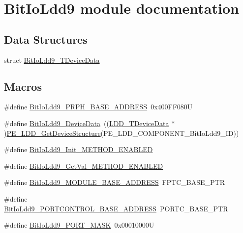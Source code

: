 \hypertarget{group___bit_io_ldd9__module}{\section{Bit\-Io\-Ldd9 module documentation}
\label{group___bit_io_ldd9__module}
}
\subsection*{Data Structures}
\begin{DoxyCompactItemize}
\item 
struct \hyperlink{struct_bit_io_ldd9___t_device_data}{Bit\-Io\-Ldd9\-\_\-\-T\-Device\-Data}
\end{DoxyCompactItemize}
\subsection*{Macros}
\begin{DoxyCompactItemize}
\item 
\#define \hyperlink{group___bit_io_ldd9__module_ga174ae74d2766cb109ec7ede1ae12bc6a}{Bit\-Io\-Ldd9\-\_\-\-P\-R\-P\-H\-\_\-\-B\-A\-S\-E\-\_\-\-A\-D\-D\-R\-E\-S\-S}~0x400\-F\-F080\-U
\item 
\#define \hyperlink{group___bit_io_ldd9__module_ga597e971eb96d12469036edb9403f1391}{Bit\-Io\-Ldd9\-\_\-\-Device\-Data}~((\hyperlink{group___p_e___types__module_gac5cf1362f1f0e3a2ce71b1bf2276d091}{L\-D\-D\-\_\-\-T\-Device\-Data} $\ast$)\hyperlink{group___p_e___types__module_gaa1c23d559daef5bcd3327ca83fb56f5a}{P\-E\-\_\-\-L\-D\-D\-\_\-\-Get\-Device\-Structure}(P\-E\-\_\-\-L\-D\-D\-\_\-\-C\-O\-M\-P\-O\-N\-E\-N\-T\-\_\-\-Bit\-Io\-Ldd9\-\_\-\-I\-D))
\item 
\#define \hyperlink{group___bit_io_ldd9__module_ga91634d0b14500dcabcc1e62debba95d3}{Bit\-Io\-Ldd9\-\_\-\-Init\-\_\-\-M\-E\-T\-H\-O\-D\-\_\-\-E\-N\-A\-B\-L\-E\-D}
\item 
\#define \hyperlink{group___bit_io_ldd9__module_ga41ccac7e5854a7ab7243478e45c51774}{Bit\-Io\-Ldd9\-\_\-\-Get\-Val\-\_\-\-M\-E\-T\-H\-O\-D\-\_\-\-E\-N\-A\-B\-L\-E\-D}
\item 
\#define \hyperlink{group___bit_io_ldd9__module_ga3db97b478a16afb88894896684327e9b}{Bit\-Io\-Ldd9\-\_\-\-M\-O\-D\-U\-L\-E\-\_\-\-B\-A\-S\-E\-\_\-\-A\-D\-D\-R\-E\-S\-S}~F\-P\-T\-C\-\_\-\-B\-A\-S\-E\-\_\-\-P\-T\-R
\item 
\#define \hyperlink{group___bit_io_ldd9__module_ga99250acc1446452fa02e1b05763e518f}{Bit\-Io\-Ldd9\-\_\-\-P\-O\-R\-T\-C\-O\-N\-T\-R\-O\-L\-\_\-\-B\-A\-S\-E\-\_\-\-A\-D\-D\-R\-E\-S\-S}~P\-O\-R\-T\-C\-\_\-\-B\-A\-S\-E\-\_\-\-P\-T\-R
\item 
\#define \hyperlink{group___bit_io_ldd9__module_ga00f12c8edf660f2448ef4619df850299}{Bit\-Io\-Ldd9\-\_\-\-P\-O\-R\-T\-\_\-\-M\-A\-S\-K}~0x00010000\-U
\end{DoxyCompactItemize}
